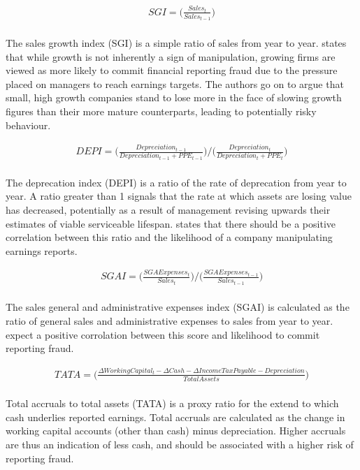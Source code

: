 {\begin{equation}\label{MScore-SGI}
\begin{aligned}
SGI = \bigg(\frac{Sales_t}{Sales_{t-1}} \bigg) 
\end{aligned}
\end{equation}\\
The sales growth index (SGI) is a simple ratio of sales from year to year. \cite{beneishOG} states that while growth is not inherently a sign of manipulation, growing firms are viewed as more likely to commit financial reporting fraud due to the pressure placed on managers to reach earnings targets. The authors go on to argue that small, high growth companies stand to lose more in the face of slowing growth figures than their more mature counterparts, leading to potentially risky behaviour.  

\begin{equation}\label{MScore-DEPI}
\begin{aligned}
DEPI = \bigg(\frac{Depreciation_{t-1}}{Depreciation_{t-1} + PPE_{t-1}} \bigg) /   \bigg(\frac{Depreciation_{t}}{Depreciation_{t} + PPE_{t}} \bigg)
\end{aligned}
\end{equation}\\
The deprecation index (DEPI) is a ratio of the rate of deprecation from year to year. A ratio greater than 1 signals that the rate at which assets are losing value has decreased, potentially as a result of management revising upwards their estimates of viable serviceable lifespan. \cite{beneishOG} states that there should be a positive correlation between this ratio and the likelihood of a company manipulating earnings reports.     

\begin{equation}\label{MScore-SGAI}
\begin{aligned}
SGAI = \bigg(\frac{SGA Expenses_{t}}{Sales_{t}} \bigg) /  \bigg(\frac{SGA Expenses_{t-1}}{Sales_{t-1}} \bigg)
\end{aligned}
\end{equation}\\
The sales general and administrative expenses index (SGAI) is calculated as the ratio of general sales and administrative expenses to sales from year to year. \cite{beneishOG} expect a positive corrolation between this score and likelihood to commit reporting fraud.  

\begin{equation}\label{MScore-TATA}
\begin{aligned}
TATA = \bigg(\frac{\Delta Working Capital_t - \Delta Cash - \Delta Income Tax Payable - Depreciation }{Total Assets} \bigg) 
\end{aligned}
\end{equation}\\
Total accruals to total assets (TATA) is a proxy ratio for the extend to which cash underlies reported earnings. Total accruals are calculated as the change in working capital accounts (other than cash) minus depreciation. Higher accruals are thus an indication of less cash, and should be associated with a higher risk of reporting fraud.  

}
